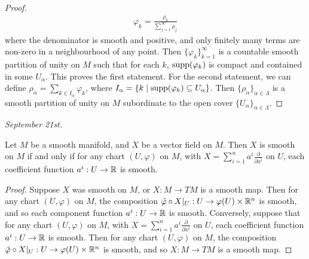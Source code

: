 \begin{proof}
    \begin{align}
        \varphi_{k} = \frac{\rho_{k}}{\sum_{j=1}^{\infty} \rho_{j}}
    \end{align}
    where the denominator is smooth and positive, and only finitely many terms are non-zero in a neighbourhood of any point. Then $\{\varphi_{k}\}_{k=1}^{\infty}$ is a countable smooth partition of unity on $M$ such that for each $k$, $\operatorname{supp}(\varphi_{k})$ is compact and contained in some $U_{\alpha}$. This proves the first statement. For the second statement, we can define $\rho_{\alpha} = \sum_{k \in I_{\alpha}} \varphi_{k}$, where $I_{\alpha} = \{k \mid \operatorname{supp}(\varphi_{k}) \subseteq U_{\alpha}\}$. Then $\{\rho_{\alpha}\}_{\alpha \in \Lambda}$ is a smooth partition of unity on $M$ subordinate to the open cover $\{U_{\alpha}\}_{\alpha \in \Lambda}$.
\end{proof}

\textit{September 21st.}

\begin{lemma}
    Let $M$ be a smooth manifold, and $X$ be a vector field on $M$. Then $X$ is smooth on $M$ if and only if for any chart $(U,\varphi)$ on $M$, with $X = \sum_{i=1}^{n} a^{i} \frac{\partial}{\partial x^{i}}$ on $U$, each coefficient function $a^{i}:U \to \mathbb{R}$ is smooth.
\end{lemma}
\begin{proof}
    Suppose $X$ was smooth on $M$, or $X:M \to TM$ is a smooth map. Then for any chart $(U,\varphi)$ on $M$, the composition $\tilde{\varphi} \circ X|_{U}: U \to \varphi(U) \times \mathbb{R}^{n}$ is smooth, and so each component function $a^{i}:U \to \mathbb{R}$ is smooth. Conversely, suppose that for any chart $(U,\varphi)$ on $M$, with $X = \sum_{i=1}^{n} a^{i} \frac{\partial}{\partial x^{i}}$ on $U$, each coefficient function $a^{i}:U \to \mathbb{R}$ is smooth. Then for any chart $(U,\varphi)$ on $M$, the composition $\tilde{\varphi} \circ X|_{U}: U \to \varphi(U) \times \mathbb{R}^{n}$ is smooth, and so $X:M \to TM$ is a smooth map.
\end{proof}


